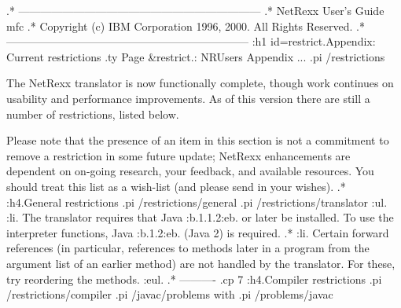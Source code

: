 .* ------------------------------------------------------------------
.* NetRexx User's Guide                                              mfc
.* Copyright (c) IBM Corporation 1996, 2000.  All Rights Reserved.
.* ------------------------------------------------------------------
:h1 id=restrict.Appendix: Current restrictions
.ty Page &restrict.: NRUsers Appendix ...
.pi /restrictions

The NetRexx translator is now functionally complete, though work
continues on usability and performance improvements.  As of this version
there are still a number of restrictions, listed below.

Please note that the presence of an item in this section is not a
commitment to remove a restriction in some future update; NetRexx
enhancements are dependent on on-going research, your feedback, and
available resources.  You should treat this list as a wish-list
(and please send in your wishes).
.*
:h4.General restrictions
.pi /restrictions/general
.pi /restrictions/translator
:ul.
:li.
The translator requires that Java :b.1.1.2:eb. or later be installed.
To use the interpreter functions, Java :b.1.2:eb. (Java 2) is required.
.*
:li.
Certain forward references (in particular, references to methods later
in a program from the argument list of an earlier method) are not
handled by the translator.  For these, try reordering the methods.
:eul.
.* ----------
.cp 7
:h4.Compiler restrictions
.pi /restrictions/compiler
.pi /javac/problems with
.pi /problems/javac

